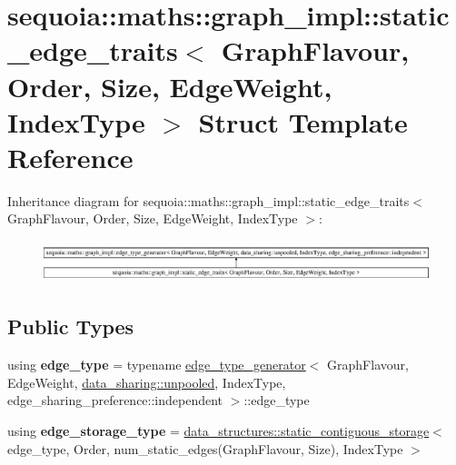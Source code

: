 \hypertarget{structsequoia_1_1maths_1_1graph__impl_1_1static__edge__traits}{}\section{sequoia\+::maths\+::graph\+\_\+impl\+::static\+\_\+edge\+\_\+traits$<$ Graph\+Flavour, Order, Size, Edge\+Weight, Index\+Type $>$ Struct Template Reference}
\label{structsequoia_1_1maths_1_1graph__impl_1_1static__edge__traits}
Inheritance diagram for sequoia\+::maths\+::graph\+\_\+impl\+::static\+\_\+edge\+\_\+traits$<$ Graph\+Flavour, Order, Size, Edge\+Weight, Index\+Type $>$\+:\begin{figure}[H]
\begin{center}
\leavevmode
\includegraphics[height=1.226725cm]{structsequoia_1_1maths_1_1graph__impl_1_1static__edge__traits}
\end{center}
\end{figure}
\subsection*{Public Types}
\begin{DoxyCompactItemize}
\item 
\mbox{\label{structsequoia_1_1maths_1_1graph__impl_1_1static__edge__traits_afd8ed70d48dc845c72538cd4531e3cda}} 
using {\bfseries edge\+\_\+type} = typename \mbox{\hyperlink{structsequoia_1_1maths_1_1graph__impl_1_1edge__type__generator}{edge\+\_\+type\+\_\+generator}}$<$ Graph\+Flavour, Edge\+Weight, \mbox{\hyperlink{classsequoia_1_1data__sharing_1_1unpooled}{data\+\_\+sharing\+::unpooled}}, Index\+Type, edge\+\_\+sharing\+\_\+preference\+::independent $>$\+::edge\+\_\+type
\item 
\mbox{\label{structsequoia_1_1maths_1_1graph__impl_1_1static__edge__traits_aa04a852ead68be1f84580b3d152d4535}} 
using {\bfseries edge\+\_\+storage\+\_\+type} = \mbox{\hyperlink{classsequoia_1_1data__structures_1_1static__contiguous__storage}{data\+\_\+structures\+::static\+\_\+contiguous\+\_\+storage}}$<$ edge\+\_\+type, Order, num\+\_\+static\+\_\+edges(Graph\+Flavour, Size), Index\+Type $>$
\end{DoxyCompactItemize}
